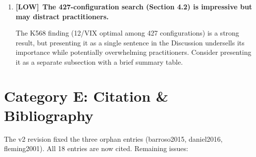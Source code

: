\documentclass[12pt,a4paper]{article}
\newcommand{\LOW}{\textcolor{lowsev}{\textbf{[LOW]}}}
\begin{document}
\begin{enumerate}[label=\textbf{D.\arabic*}]
\item \LOW\ \textbf{The 427-configuration search (Section 4.2) is impressive but may distract practitioners.}

The K568 finding (12/VIX optimal among 427 configurations) is a strong result, but presenting it as a single sentence in the Discussion undersells its importance while potentially overwhelming practitioners. Consider presenting it as a separate subsection with a brief summary table.

\end{enumerate}


\section{Category E: Citation \& Bibliography}

The v2 revision fixed the three orphan entries (barroso2015, daniel2016, fleming2001). All 18 entries are now cited. Remaining issues:
\end{document}
